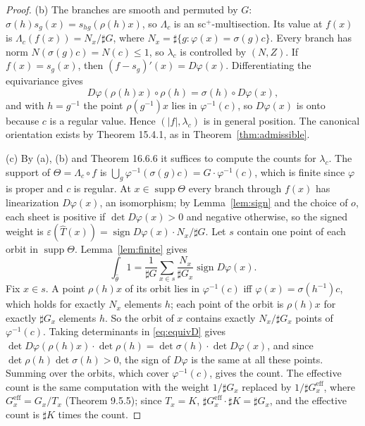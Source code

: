 \documentclass[11pt,a4paper]{article}
\theoremstyle{plain}
\theoremstyle{definition}
\theoremstyle{remark}
\newcommand{\abs}[1]{\lvert #1\rvert}
\newcommand{\card}{\sharp}
\newcommand{\supp}{\operatorname{supp}}
\begin{document}
\begin{proof}
(b) The branches are smooth and permuted by $G$: $\sigma(h)s_g(x)=s_{hg}(\rho(h)x)$, so $\Lambda_c$ is an
sc$^+$-multisection. Its value at $f(x)$ is $\Lambda_c(f(x))=N_x/\card G$, where
$N_x=\card\{g:\varphi(x)=\sigma(g)c\}$. Every branch has norm $N(\sigma(g)c)=N(c)\le1$, so $\lambda_c$ is
controlled by $(N,Z)$. If $f(x)=s_g(x)$, then $(f-s_g)'(x)=D\varphi(x)$. Differentiating the equivariance
gives
\begin{equation}\label{eq:equivD}
  D\varphi(\rho(h)x)\circ\rho(h)=\sigma(h)\circ D\varphi(x),
\end{equation}
and with $h=g^{-1}$ the point $\rho(g^{-1})x$ lies in $\varphi^{-1}(c)$, so $D\varphi(x)$ is onto because
$c$ is a regular value. Hence $(\abs f,\lambda_c)$ is in general position. The canonical orientation
exists by Theorem 15.4.1, as in Theorem~\ref{thm:admissible}.

(c) By (a), (b) and Theorem 16.6.6 it suffices to compute the counts for $\lambda_c$. The support of
$\Theta=\Lambda_c\circ f$ is $\bigcup_g\varphi^{-1}(\sigma(g)c)=G\cdot\varphi^{-1}(c)$, which is finite since
$\varphi$ is proper and $c$ is regular. At $x\in\supp\Theta$ every branch through $f(x)$ has
linearization $D\varphi(x)$, an isomorphism; by Lemma~\ref{lem:sign} and the choice of $o$, each sheet is
positive if $\det D\varphi(x)>0$ and negative otherwise, so the signed weight is
$\varepsilon(\hat T(x))=\operatorname{sign}D\varphi(x)\cdot N_x/\card G$. Let $s$ contain one point of
each orbit in $\supp\Theta$. Lemma~\ref{lem:finite} gives
\[
  \int_{\hat\theta}1=\frac1{\card G}\sum_{x\in s}\frac{N_x}{\card G_x}\operatorname{sign}D\varphi(x).
\]
Fix $x\in s$. A point $\rho(h)x$ of its orbit lies in $\varphi^{-1}(c)$ iff $\varphi(x)=\sigma(h^{-1})c$, which
holds for exactly $N_x$ elements $h$; each point of the orbit is $\rho(h)x$ for exactly $\card G_x$
elements $h$. So the orbit of $x$ contains exactly $N_x/\card G_x$ points of $\varphi^{-1}(c)$. Taking
determinants in \eqref{eq:equivD} gives
$\det D\varphi(\rho(h)x)\cdot\det\rho(h)=\det\sigma(h)\cdot\det D\varphi(x)$, and since
$\det\rho(h)\det\sigma(h)>0$, the sign of $D\varphi$ is the same at all these points. Summing over the
orbits, which cover $\varphi^{-1}(c)$, gives the count. The effective count is the same computation with
the weight $1/\card G_x$ replaced by $1/\card G_x^{\mathrm{eff}}$, where $G_x^{\mathrm{eff}}=G_x/T_x$
(Theorem 9.5.5); since $T_x=K$, $\card G_x^{\mathrm{eff}}\cdot\card K=\card G_x$, and the effective count
is $\card K$ times the count.
\end{proof}
\end{document}
